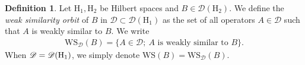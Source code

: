 \documentclass[12pt]{amsart}
\numberwithin{equation}{section}
\newcommand{\D}{\mathbf{D}}
\newcommand{\LL}{\Lambda}
\newcommand{\cD}{\mathcal{D}}
\newcommand{\rH}{\mathrm{H}}
\theoremstyle{definition}
\newtheorem{definition}[thm]{Definition}
\theoremstyle{assump}
\theoremstyle{remark}
\begin{document}
\begin{definition}
	Let $\rH_1,\rH_2$ be Hilbert spaces and $B\in\mathscr{D}(\rH_2)$. We define the \emph{weak similarity orbit} of $B$ in $\mathscr{D}\subset\mathscr{D}(\rH_1)$ as the set of all operators $A\in\mathscr{D}$ such that $A$ is weakly similar to $B$. We write
	\begin{align*}
		\mathrm{WS}_{\mathscr{D}}(B)=\{A\in\mathscr{D}; \: \text{$A$ is weakly similar to $B$}\}.
	\end{align*}
When $\mathscr{D}=\mathscr{D}({\rm H}_1)$, we simply denote $\mathrm{WS}(B)=\mathrm{WS}_{\mathscr{D}}(B)$.
\end{definition}
\end{document}
